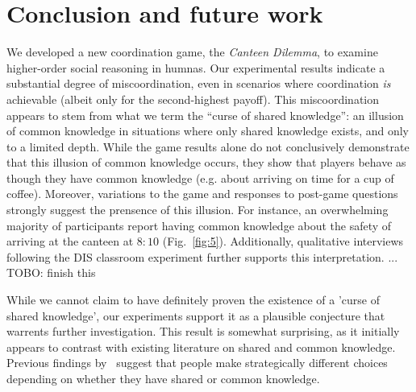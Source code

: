 \documentclass[twocolumn,a4paper,superscriptaddress,nofootinbib]{revtex4}
\newcommand{\tobo}[1]{{\color{red} TOBO: #1}}
\begin{document}
\section{Conclusion and future work} \label{S:conclusion}
We developed a new coordination game, the \emph{Canteen Dilemma}, to examine higher-order social reasoning in humnas. Our experimental results %
indicate a substantial degree of miscoordination, even in scenarios where coordination \emph{is} achievable (albeit only for the second-highest payoff). This miscoordination appears to stem from what we term the ``curse of shared knowledge'': an illusion of common knowledge in situations where only shared knowledge exists, and only to a limited depth. While the game results alone do not conclusively demonstrate that this illusion of common knowledge occurs, they show that players behave as though they have common knowledge (e.g. about arriving on time for a cup of coffee). Moreover, variations to the game and responses to post-game questions strongly suggest the prensence of this illusion. For instance, an overwhelming majority of participants report having common knowledge about the safety of arriving at the canteen at $8{:}10$ (Fig.~\ref{fig:5}). Additionally, qualitative interviews following the DIS classroom experiment further supports this interpretation. ... \tobo{finish this}

While we cannot claim to have definitely proven the existence of a 'curse of shared knowledge', our experiments support it as a plausible conjecture that warrents further investigation. This result is somewhat surprising, as it initially appears to contrast with existing literature on shared and common knowledge. 
Previous findings by~\cite{lee2010rationales, thomas2014psychology, thomas2016recursive, thomas2018common, de2019common, de2019maimonides} suggest that people make strategically different choices depending on whether they have shared or common knowledge. 
\end{document}

